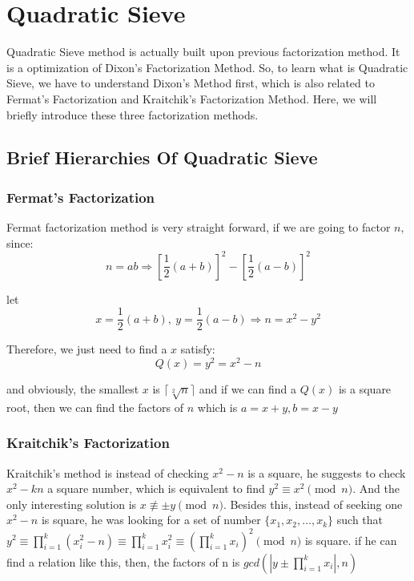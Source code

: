 \documentclass[12pt]{article} %
\begin{document}
\section{Quadratic Sieve}

Quadratic Sieve method is actually built upon previous factorization method. It is a optimization of Dixon's Factorization Method. So, to learn what is Quadratic Sieve, we have to understand Dixon's Method first, which is also related to Fermat's Factorization and Kraitchik's Factorization Method. Here, we will briefly introduce these three factorization methods.

\subsection {Brief Hierarchies Of Quadratic Sieve}

\subsubsection {Fermat's Factorization}
Fermat factorization method is very straight forward, if we are going to factor $n$, since: $$n = ab \Rightarrow \left [\frac{1}{2}(a+b) \right ]^{2} - \left [\frac{1}{2}(a-b) \right ]^{2}$$

let $$ x= \frac{1}{2}(a+b),\ y= \frac{1}{2}(a-b) \Rightarrow n = x^2 - y^2$$ 

Therefore, we just need to find a $x$ satisfy: $$Q(x) = y^2 = x^2 - n$$ 

and obviously, the smallest $x$ is $\lceil \sqrt[2]{n}\rceil$ and if we can find a $Q(x)$ is a square root, then we can find the factors of $n$ which is $a=x+y, b=x-y$

\subsubsection {Kraitchik's Factorization}
Kraitchik's method is instead of checking $x^2-n$ is a square, he suggests to check $x^2 - kn$ a square number, which is equivalent to find $y^2 \equiv x^2 \pmod{n} $. And the only interesting solution is $ x \not\equiv \pm y \pmod{n}$. Besides this, instead of seeking one $x^2-n$ is square, he was looking for a set of number $ \{x_1, x_2, \dots, x_k\} $ such that $\displaystyle y^2 \equiv \prod_{i=1}^k{(x_i^2 - n)} \equiv \prod_{i=1}^k{x_i^2} \equiv \left (\prod_{i=1}^k{x_i}\right)^2 \pmod{n} $ is square. if he can find a relation like this, then, the factors of n is $\displaystyle gcd(|y \pm \prod_{i=1}^k{x_i}|, n)$
\end{document}
